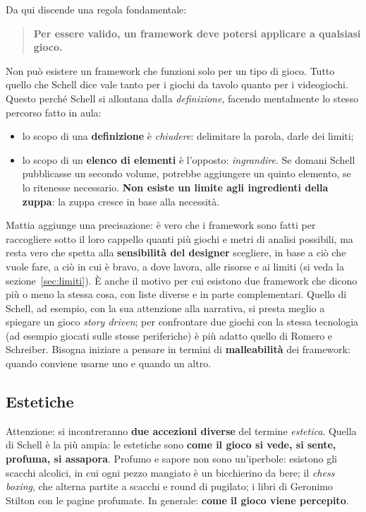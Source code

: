Da qui discende una regola fondamentale:
\begin{quote}
\textbf{Per essere valido, un framework deve potersi applicare a qualsiasi
gioco.}
\end{quote}
Non può esistere un framework che funzioni solo per un tipo di gioco. Tutto
quello che Schell dice vale tanto per i giochi da tavolo quanto per i
videogiochi. Questo perché Schell si allontana dalla \emph{definizione},
facendo mentalmente lo stesso percorso fatto in aula:
\begin{itemize}
  \item lo scopo di una \textbf{definizione} è \emph{chiudere}: delimitare la
        parola, darle dei limiti;
  \item lo scopo di un \textbf{elenco di elementi} è l'opposto:
        \emph{ingrandire}. Se domani Schell pubblicasse un secondo volume,
        potrebbe aggiungere un quinto elemento, se lo ritenesse necessario.
        \textbf{Non esiste un limite agli ingredienti della zuppa}: la zuppa
        cresce in base alla necessità.
\end{itemize}

Mattia aggiunge una precisazione: è vero che i framework sono fatti per
raccogliere sotto il loro cappello quanti più giochi e metri di analisi
possibili, ma resta vero che spetta alla \textbf{sensibilità del designer}
scegliere, in base a ciò che vuole fare, a ciò in cui è bravo, a dove lavora,
alle risorse e ai limiti (si veda la sezione~\ref{sec:limiti}). È anche il
motivo per cui esistono due framework che dicono più o meno la stessa cosa, con
liste diverse e in parte complementari. Quello di Schell, ad esempio, con la
sua attenzione alla narrativa, si presta meglio a spiegare un gioco
\emph{story driven}; per confrontare due giochi con la stessa tecnologia (ad
esempio giocati sulle stesse periferiche) è più adatto quello di Romero e
Schreiber. Bisogna iniziare a pensare in termini di \textbf{malleabilità} dei
framework: quando conviene usarne uno e quando un altro.

\subsection{Estetiche}

Attenzione: si incontreranno \textbf{due accezioni diverse} del termine
\emph{estetica}. Quella di Schell è la più ampia: le estetiche sono
\textbf{come il gioco si vede, si sente, profuma, si assapora}. Profumo e sapore
non sono un'iperbole: esistono gli scacchi alcolici, in cui ogni pezzo mangiato
è un bicchierino da bere; il \emph{chess boxing}, che alterna partite a scacchi
e round di pugilato; i libri di Geronimo Stilton con le pagine profumate. In
generale: \textbf{come il gioco viene percepito}.

